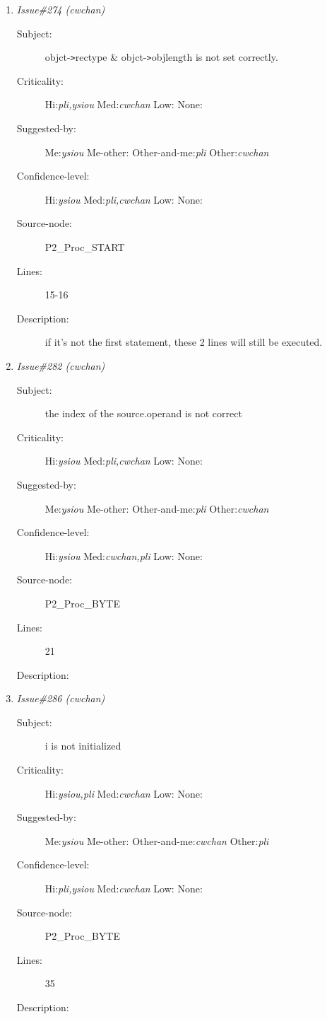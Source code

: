 \begin{enumerate}
\begin{description}
\item [Lines:] 60 49

\item [Description:] \% should be used.
\end{description}
\item {\it Issue\#274 (cwchan)}
\begin{description}
\item [Subject:] objct-{\tt >}rectype \& objct-{\tt >}objlength is not set correctly.
\item [Criticality:] Hi:{\it pli,ysiou} Med:{\it cwchan} Low:{\it } None:{\it }
\item [Suggested-by:] Me:{\it ysiou} Me-other:{\it } Other-and-me:{\it pli} Other:{\it cwchan}
\item [Confidence-level:] Hi:{\it ysiou} Med:{\it pli,cwchan} Low:{\it } None:{\it }
\item [Source-node:] P2\_Proc\_START

\item [Lines:] 15-16

\item [Description:] if it's not the first statement, these 2 lines
will still be executed.
\end{description}
\item {\it Issue\#282 (cwchan)}
\begin{description}
\item [Subject:] the index of the source.operand is not correct
\item [Criticality:] Hi:{\it ysiou} Med:{\it pli,cwchan} Low:{\it } None:{\it }
\item [Suggested-by:] Me:{\it ysiou} Me-other:{\it } Other-and-me:{\it pli} Other:{\it cwchan}
\item [Confidence-level:] Hi:{\it ysiou} Med:{\it cwchan,pli} Low:{\it } None:{\it }
\item [Source-node:] P2\_Proc\_BYTE

\item [Lines:] 21

\item [Description:] 
\end{description}
\item {\it Issue\#286 (cwchan)}
\begin{description}
\item [Subject:] i is not initialized
\item [Criticality:] Hi:{\it ysiou,pli} Med:{\it cwchan} Low:{\it } None:{\it }
\item [Suggested-by:] Me:{\it ysiou} Me-other:{\it } Other-and-me:{\it cwchan} Other:{\it pli}
\item [Confidence-level:] Hi:{\it pli,ysiou} Med:{\it cwchan} Low:{\it } None:{\it }
\item [Source-node:] P2\_Proc\_BYTE

\item [Lines:] 35

\item [Description:] 
\end{description}
\end{enumerate}
